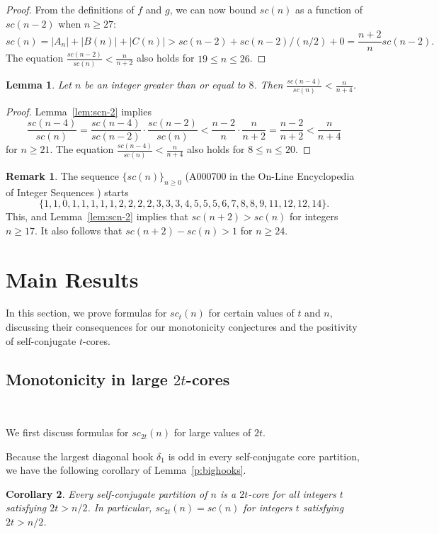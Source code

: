 \documentclass[12pt,leqno]{amsart}
\newtheorem{lem}{Lemma}[section]
\newtheorem{cor}[lem]{Corollary}
\numberwithin{equation}{section}
\theoremstyle{definition}
\newtheorem*{remark}{Remark}
\begin{document}
\begin{proof}
From the definitions of $f$ and $g$, we can now bound $sc(n)$ as a function of $sc(n-2)$ when  $n\geq 27$:
\[sc(n)=|A_n|+|B(n)|+|C(n)|> sc(n-2)+sc(n-2)/(n/2)+0=\frac{n+2}{n}sc(n-2).\]
The equation $\frac{sc(n-2)}{sc(n)}< \frac{n}{n+2}$ also holds for $19\leq n \leq 26$.
\end{proof}

\begin{lem}
Let $n$ be an integer greater than or equal to $8$.  Then $\frac{sc(n-4)}{sc(n)}< \frac{n}{n+4}$.
\label{lem:scn-4}
\end{lem}
\begin{proof}Lemma~\ref{lem:scn-2} implies \[\frac{sc(n-4)}{sc(n)}=\frac{sc(n-4)}{sc(n-2)}\cdot\frac{sc(n-2)}{sc(n)}< \frac{n-2}{n}\cdot\frac{n}{n+2}=\frac{n-2}{n+2}<\frac{n}{n+4}\]
for $n\geq 21$.  The equation $\frac{sc(n-4)}{sc(n)}< \frac{n}{n+4}$ also holds for $8\leq n \leq 20$.
\end{proof}

\begin{remark}
The sequence $\{sc(n)\}_{n\geq 0}$ (A000700 in the On-Line Encyclopedia of Integer Sequences \cite{oeis}) starts 
\[\{1, 1, 0, 1, 1, 1, 1, 1, 2, 2, 2, 2, 3, 3, 3, 4, 5, 5, 5, 6, 7, 8, 8, 9, 11, 12, 12, 14\}.\] This, and Lemma~\ref{lem:scn-2} implies that $sc(n+2)>sc(n)$ for integers $n\geq 17$.  It also follows that $sc(n+2)-sc(n)>1$ for $n\geq 24$.  
\end{remark}

\section{Main Results}
\label{sec:mono}

In this section, we prove formulas for $sc_{t}(n)$ for certain values of $t$ and $n$, discussing their consequences for our monotonicity conjectures and the positivity of self-conjugate $t$-cores.

\subsection{Monotonicity in large $2t$-cores}\

We first discuss formulas for $sc_{2t}(n)$ for large values of $2t$.

\medskip
Because the largest diagonal hook $\delta_1$ is odd in every self-conjugate core partition, we have the following corollary of Lemma~\ref{p:bighooks}.
\begin{cor} 
\label{cor:n/2}
Every self-conjugate partition of $n$ is a $2t$-core for all integers $t$ satisfying $2t>n/2$. In particular,  $sc_{2t}(n)=sc(n)$ for integers $t$ satisfying $2t>n/2$. 
\end{cor}
\end{document}
